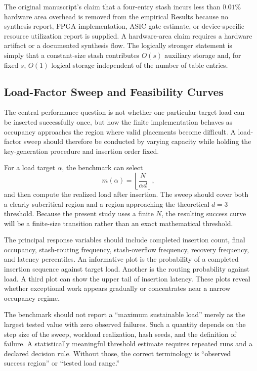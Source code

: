 \documentclass[conference]{IEEEtran}
\begin{document}
The original manuscript's claim that a four-entry stash incurs less than $0.01\%$ hardware area overhead is removed from the empirical Results because no synthesis report, FPGA implementation, ASIC gate estimate, or device-specific resource utilization report is supplied. A hardware-area claim requires a hardware artifact or a documented synthesis flow. The logically stronger statement is simply that a constant-size stash contributes $O(s)$ auxiliary storage and, for fixed $s$, $O(1)$ logical storage independent of the number of table entries.

\subsection{Load-Factor Sweep and Feasibility Curves}
\label{subsec:load_sweep_results}

The central performance question is not whether one particular target load can be inserted successfully once, but how the finite implementation behaves as occupancy approaches the region where valid placements become difficult. A load-factor sweep should therefore be conducted by varying capacity while holding the key-generation procedure and insertion order fixed.

For a load target $\alpha$, the benchmark can select
\begin{equation}
m(\alpha)=\left\lfloor \frac{N}{\alpha d}\right\rfloor,
\end{equation}
and then compute the realized load after insertion. The sweep should cover both a clearly subcritical region and a region approaching the theoretical $d=3$ threshold. Because the present study uses a finite $N$, the resulting success curve will be a finite-size transition rather than an exact mathematical threshold.

The principal response variables should include completed insertion count, final occupancy, stash-routing frequency, stash-overflow frequency, recovery frequency, and latency percentiles. An informative plot is the probability of a completed insertion sequence against target load. Another is the routing probability against load. A third plot can show the upper tail of insertion latency. These plots reveal whether exceptional work appears gradually or concentrates near a narrow occupancy regime.

The benchmark should not report a ``maximum sustainable load'' merely as the largest tested value with zero observed failures. Such a quantity depends on the step size of the sweep, workload realization, hash seeds, and the definition of failure. A statistically meaningful threshold estimate requires repeated runs and a declared decision rule. Without those, the correct terminology is ``observed success region'' or ``tested load range.''
\end{document}
